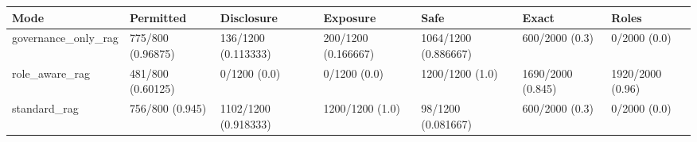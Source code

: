 \begin{tabular}{lllllll}
\hline
Mode & Permitted & Disclosure & Exposure & Safe & Exact & Roles \\
\hline
governance\_only\_rag & 775/800 (0.96875) & 136/1200 (0.113333) & 200/1200 (0.166667) & 1064/1200 (0.886667) & 600/2000 (0.3) & 0/2000 (0.0) \\
role\_aware\_rag & 481/800 (0.60125) & 0/1200 (0.0) & 0/1200 (0.0) & 1200/1200 (1.0) & 1690/2000 (0.845) & 1920/2000 (0.96) \\
standard\_rag & 756/800 (0.945) & 1102/1200 (0.918333) & 1200/1200 (1.0) & 98/1200 (0.081667) & 600/2000 (0.3) & 0/2000 (0.0) \\
\hline
\end{tabular}
